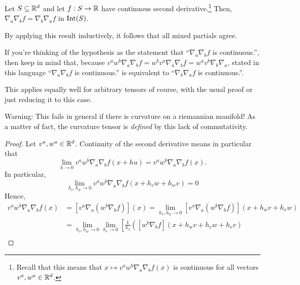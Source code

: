 \begin{exm}

\end{exm}
\begin{thm}\label{ClariutsTheorem}
Let $S\subseteq \mathbb{R} ^d$ and let $f:S\rightarrow \mathbb{R}$ have continuous second derivative.\footnote{Recall that this means that $x\mapsto v^aw^b\nabla _a\nabla _bf(x)$ is continuous for all vectors $v^a,w^a\in \mathbb{R} ^d$.}  Then, $\nabla _a\nabla _bf=\nabla _b\nabla _af$ in $\operatorname{Int} (S)$.
\begin{rmk}
By applying this result inductively, it follows that all mixed partials agree.
\end{rmk}
\begin{rmk}
If you're thinking of the hypothesis as the statement that ``$\nabla _a\nabla _bf$ is continuous.'', then keep in mind that, because $v^aw^b\nabla _a\nabla _bf=w^bv^a\nabla _a\nabla _bf=w^av^b\nabla _b\nabla _a$, stated in this language ``$\nabla _a\nabla _bf$ is continuous.'' is equivalent to ``$\nabla _b\nabla _af$ is continuous.''.
\end{rmk}
\begin{rmk}
This applies equally well for arbitrary tensors of course, with the usual proof or just reducing it to this case.
\end{rmk}
\begin{rmk}
Warning:  This fails in general if there is curvature on a riemannian manifold!  As a matter of fact, the curvature tensor is \emph{defined} by this lack of commutativity.
\end{rmk}
\begin{proof}
Let $v^a,w^a\in \mathbb{R} ^d$.  Continuity of the second derivative means in particular that
\begin{equation}
\lim _{h\to 0}v^aw^b\nabla _a\nabla _bf(x+hu)=v^aw^b\nabla _a\nabla _bf(x).
\end{equation}
In particular,
\begin{equation}
\lim _{h_v,h_w\to 0}v^aw^b\nabla _a\nabla _bf(x+h_vw+h_wv)=0
\end{equation}
Hence,
\begin{equation}
\begin{split}
v^aw^b\nabla _a\nabla _bf(x) & =[v^a\nabla _a(w^b\nabla _bf)](x)=\lim _{h_v,h_w\to 0}[v^a\nabla _a(w^b\nabla _bf)](x+h_wv+h_vw) \\
& =\lim _{h_v,h_w\to 0}\lim _{h_v\to 0}\left[ \frac{1}{h_v}\left( [w^b\nabla _bf](x+h_wv+h_vw+h_vv)\right. \right. \\

\end{split}
\end{equation}
\end{proof}
\end{thm}
